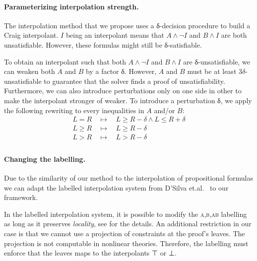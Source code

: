 \paragraph{Parameterizing interpolation strength.}

The interpolation method that we propose uses a δ-decision procedure to build a Craig interpolant.
$I$ being an interpolant means that $A ∧ ¬I$ and $B ∧ I$ are both unsatisfiable.
However, these formulas might still be δ-satisfiable.

To obtain an interpolant such that both $A ∧ ¬I$ and $B ∧ I$ are δ-unsatisfiable, we can weaken both $A$ and $B$ by a factor δ.
However, $A$ and $B$ must be at least $3δ$-unsatisfiable to guarantee that the solver finds a proof of unsatisfiability.
Furthermore, we can also introduce perturbations only on one side in other to make the interpolant stronger of weaker.
To introduce a perturbation δ, we apply the following rewriting to every inequalities in $A$ and/or $B$:
\begin{eqnarray*}
L = R & ~~ \mapsto ~~ & L ≥ R - δ ∧ L ≤ R + δ \\
L ≥ R & ~~ \mapsto ~~ & L ≥ R - δ \\
L > R & ~~ \mapsto ~~ & L > R - δ \\
\end{eqnarray*}

\paragraph{Changing the labelling.}
Due to the similarity of our method to the interpolation of propositional formulas we can adapt the labelled interpolation system from D'Silva et.al.~\cite{DBLP:conf/vmcai/DSilvaKPW10} to our framework.

In the labelled interpolation system, it is possible to modify the \textsc{a,b,ab} labelling as long as it preserves \emph{locality}, see \cite{DBLP:conf/vmcai/DSilvaKPW10} for the details.
An additional restriction in our case is that we cannot use a projection of constraints at the proof's leaves.
The projection is not computable in nonlinear theories.
Therefore, the labelling must enforce that the leaves maps to the interpolants ⊤ or ⊥.
